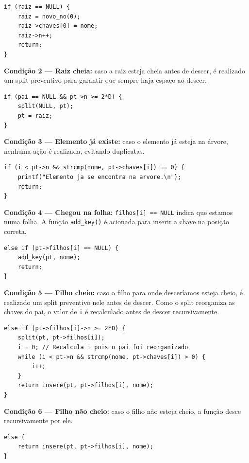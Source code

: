 \documentclass[12pt,a4paper]{article}
\begin{document}
\begin{lstlisting}
if (raiz == NULL) {
    raiz = novo_no(0);
    raiz->chaves[0] = nome;
    raiz->n++;
    return;
}
\end{lstlisting}

\textbf{Condição 2 — Raiz cheia:} caso a raiz esteja cheia antes de descer, é realizado um split preventivo para garantir que sempre haja espaço ao descer.

\begin{lstlisting}
if (pai == NULL && pt->n >= 2*D) {
    split(NULL, pt);
    pt = raiz;
}
\end{lstlisting}

\textbf{Condição 3 — Elemento já existe:} caso o elemento já esteja na árvore, nenhuma ação é realizada, evitando duplicatas.

\begin{lstlisting}
if (i < pt->n && strcmp(nome, pt->chaves[i]) == 0) {
    printf("Elemento ja se encontra na arvore.\n");
    return;
}
\end{lstlisting}

\textbf{Condição 4 — Chegou na folha:} \texttt{filhos[i] == NULL} indica que estamos numa folha. A função \texttt{add\_key()} é acionada para inserir a chave na posição correta.

\begin{lstlisting}
else if (pt->filhos[i] == NULL) {
    add_key(pt, nome);
    return;
}
\end{lstlisting}

\textbf{Condição 5 — Filho cheio:} caso o filho para onde desceríamos esteja cheio, é realizado um split preventivo nele antes de descer. Como o split reorganiza as chaves do pai, o valor de \texttt{i} é recalculado antes de descer recursivamente.

\begin{lstlisting}
else if (pt->filhos[i]->n >= 2*D) {
    split(pt, pt->filhos[i]);
    i = 0; // Recalcula i pois o pai foi reorganizado
    while (i < pt->n && strcmp(nome, pt->chaves[i]) > 0) {
        i++;
    }
    return insere(pt, pt->filhos[i], nome);
}
\end{lstlisting}

\textbf{Condição 6 — Filho não cheio:} caso o filho não esteja cheio, a função desce recursivamente por ele.

\begin{lstlisting}
else {
    return insere(pt, pt->filhos[i], nome);
}
\end{lstlisting}
\end{document}
